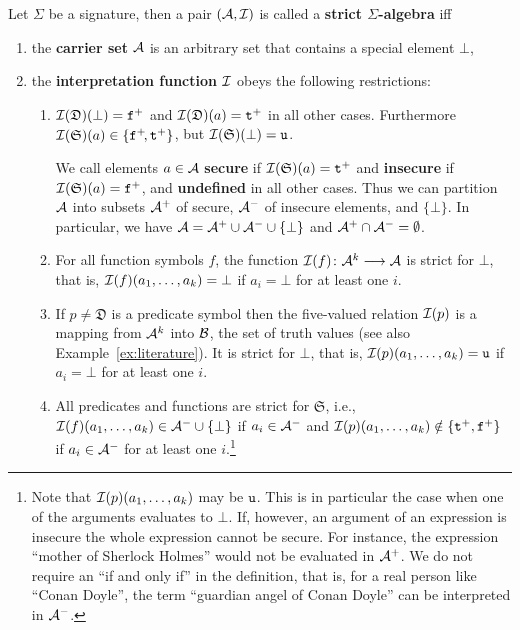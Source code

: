 \documentclass{\filespath jancl}
\def\Signat{{\Sigma}}                 %
\def\to{\longrightarrow}
\def\cA{{\cal A}}\def\cB{{\cal B}}\def\cC{{\cal C}}
\newcommand{\Defined}{{\mathfrak D}}
\newcommand{\Secure}{{\mathfrak S}}
\newcommand{\undefined}{{\tt u}}
\newcommand{\twts}{{{\tt t}^+}}
\newcommand{\twfs}{{{\tt f}^+}}
\begin{document}
\begin{definition}\label{def:strictsigma}
  Let $\Signat$ be a signature, then a pair $(\cA,\cI)$ is called a {\bf strict
    $\Sigma$-algebra} iff\vspace{-1.5ex}
   \begin{enumerate}
     \item the {\bf carrier set} $\cA$ is an arbitrary set that contains a
       special element $\bot$,
     \item\label{alg:int} the {\bf interpretation function ${\cal I}$} obeys the following
       restrictions: 
        \begin{enumerate}
           \item $\cI(\Defined)(\bot)=\twfs$ and  $\cI(\Defined)(a)=\twts$
             in all other cases. Furthermore $\cI(\Secure)(a)\in\{\twfs\!,\twts\}$, but
             $\cI(\Secure)(\bot)=\undefined$. 
             
             We call elements $a\in\cA$ {\bf secure} if $\cI(\Secure)(a)=\twts$
             and {\bf insecure} if $\cI(\Secure)(a)=\twfs$, and {\bf
             undefined} in all other cases. Thus we can partition $\cA$ into subsets $\cA^+$ of
             secure, $\cA^-$ of insecure elements, and $\{\bot\}$. In
             particular, we have
             $\cA=\cA^+\cup\cA^-\cup\{\bot\}$ and $\cA^+\cap\cA^-=\emptyset$.

           \item For all function symbols $f$, the function
             $\cI(f)\colon\cA^k\to\cA$ is strict for $\bot$, that is,
             ${\cal I}(f)(a_1,\ldots,a_k)=\bot$ if $a_i=\bot$ for at least one
             $i$.
           \item If $p\ne\Defined$ is a predicate symbol then the five-valued
             relation ${\cal I}(p)$ is a mapping from $\cA^k$ into $\cB$, the set of
             truth values (see also Example~\ref{ex:literature}).  It is strict for
             $\bot$, that is, $\cI(p)(a_1,\ldots,a_k)=\undefined$ if $a_i=\bot$
             for at least one $i$.
           \item\label{alg:strict} All predicates and functions are strict for $\Secure$,
             i.e., $\cI(f)(a_1,\ldots,a_k)\in\cA^-\cup\{\bot\}$ if $a_{i}\in\cA^{-}$ and 
              $\cI(p)(a_1,\ldots,a_k)\notin\{\twts,\twfs\}$ if
             $a_{i}\in\cA^{-}$ for at least one $i$.\footnote{Note that
             ${\cal I}(p)(a_1,\ldots,a_k)$ may be $\undefined$.  This is in particular
             the case when one of the arguments evaluates to $\bot$.
             If, however, an argument of an expression is insecure the whole
             expression cannot be secure.  For instance, the expression ``mother of
             Sherlock Holmes'' would not be evaluated in $\cA^+$. We do not
             require an ``if and only if'' in the definition, that
             is, for a real person like ``Conan Doyle'', the
             term ``guardian angel of Conan Doyle'' can be
             interpreted in $\cA^-$.}
        \end{enumerate}
  \end{enumerate}
\end{definition}
  
\end{document}
